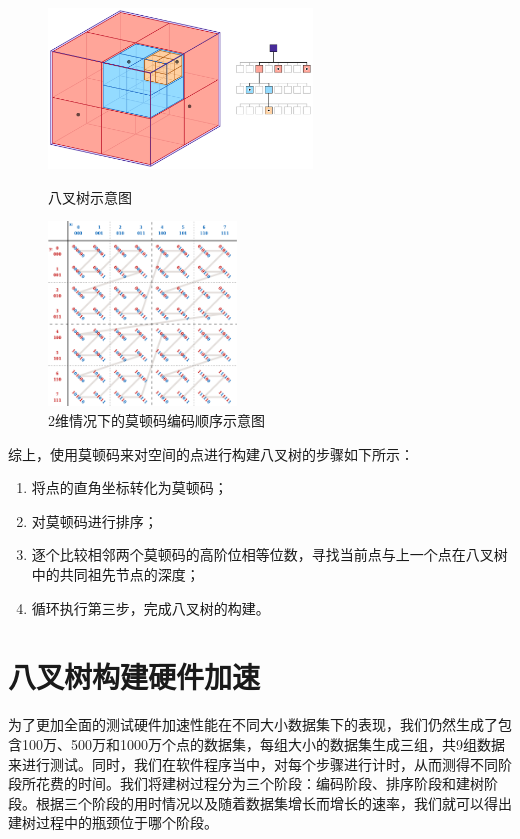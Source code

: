 \begin{figure}[htbp]
\centering
\begin{minipage}[t]{0.48\textwidth}
\centering
\includegraphics[width=7cm]{figures/octree.png}
\caption{八叉树示意图}
\label{fig:octree}
\end{minipage}
\begin{minipage}[t]{0.38\textwidth}
\centering
\includegraphics[width=5cm]{figures/Z-curve45.pdf}
\caption{2维情况下的莫顿码编码顺序示意图}
\label{fig:morton_code}
\end{minipage}
\end{figure}

综上，使用莫顿码来对空间的点进行构建八叉树的步骤如下所示：
\begin{enumerate}
    \item 将点的直角坐标转化为莫顿码；
    \item 对莫顿码进行排序；
    \item 逐个比较相邻两个莫顿码的高阶位相等位数，寻找当前点与上一个点在八叉树中的共同祖先节点的深度；
    \item 循环执行第三步，完成八叉树的构建。
\end{enumerate}



\section{八叉树构建硬件加速}

为了更加全面的测试硬件加速性能在不同大小数据集下的表现，我们仍然生成了包含100万、500万和1000万个点的数据集，每组大小的数据集生成三组，共9组数据来进行测试。同时，我们在软件程序当中，对每个步骤进行计时，从而测得不同阶段所花费的时间。我们将建树过程分为三个阶段：编码阶段、排序阶段和建树阶段。根据三个阶段的用时情况以及随着数据集增长而增长的速率，我们就可以得出建树过程中的瓶颈位于哪个阶段。

